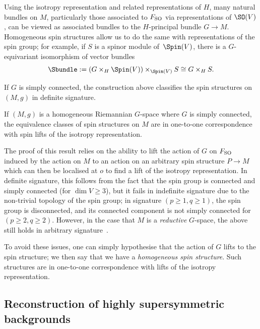 Using the isotropy representation and related representations of $H$, many natural bundles on $M$, particularly those associated to $F_{\rm SO}$ via representations of $\SO(V)$, can be viewed as associated bundles to the $H$-principal bundle $G\to M$. Homogeneous spin structures allow us to do the same with representations of the spin group; for example, if $S$ is a spinor module of~$\Spin(V)$, there is a $G$-equivariant isomorphism of vector bundles
\[
	\Sbundle := (G\times_H\Spin(V))\times_{\Spin(V)} S \cong G\times_H S.
\]

If $G$ is simply connected, the construction above classifies the spin structures on $(M,g)$ in definite signature.

\begin{Lemma}\label{lemma:homogeneous-spin}
	If $(M,g)$ is a homogeneous Riemannian $G$-space where $G$ is simply connected, the equivalence classes of spin structures on $M$ are in one-to-one correspondence with spin lifts of the isotropy representation.
\end{Lemma}

The proof of this result relies on the ability to lift the action of $G$ on $F_{\rm SO}$ induced by the action on $M$ to an action on an arbitrary spin structure $P\to M$ which can then be localised at $o$ to find a lift of the isotropy representation. In definite signature, this follows from the fact that the spin group is connected and simply connected (for $\dim V \geq 3$), but it fails in indefinite signature due to the non-trivial topology of the spin group; in signature $(p\geq 1,q\geq 1)$, the spin group is disconnected, and its connected component is not simply connected for $(p\geq 2,q\geq 2)$. However, in the case that $M$ is a \emph{reductive} $G$-space, the above still holds in arbitrary signature~\cite{Alekseevsky2019,Cahen1993}.

To avoid these issues, one can simply hypothesise that the action of $G$ lifts to the spin structure; we then say that we have a \emph{homogeneous spin structure}. Such structures are in one-to-one correspondence with lifts of the isotropy representation.

\subsection{Reconstruction of highly supersymmetric backgrounds}
\label{sec:high-susy-spin-mfld-homogeneous}

